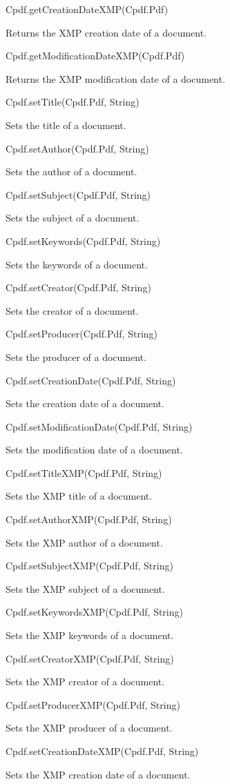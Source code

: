 Cpdf.getCreationDateXMP(Cpdf.Pdf)

Returns the XMP creation date of a document.

Cpdf.getModificationDateXMP(Cpdf.Pdf)

Returns the XMP modification date of a document.

Cpdf.setTitle(Cpdf.Pdf, String)

Sets the title of a document.

Cpdf.setAuthor(Cpdf.Pdf, String)

Sets the author of a document.

Cpdf.setSubject(Cpdf.Pdf, String)

Sets the subject of a document.

Cpdf.setKeywords(Cpdf.Pdf, String)

Sets the keywords of a document.

Cpdf.setCreator(Cpdf.Pdf, String)

Sets the creator of a document.

Cpdf.setProducer(Cpdf.Pdf, String)

Sets the producer of a document.

Cpdf.setCreationDate(Cpdf.Pdf, String)

Sets the creation date of a document.

Cpdf.setModificationDate(Cpdf.Pdf, String)

Sets the modification date of a document.

Cpdf.setTitleXMP(Cpdf.Pdf, String)

Sets the XMP title of a document.

Cpdf.setAuthorXMP(Cpdf.Pdf, String)

Sets the XMP author of a document.

Cpdf.setSubjectXMP(Cpdf.Pdf, String)

Sets the XMP subject of a document.

Cpdf.setKeywordsXMP(Cpdf.Pdf, String)

Sets the XMP keywords of a document.

Cpdf.setCreatorXMP(Cpdf.Pdf, String)

Sets the XMP creator of a document.

Cpdf.setProducerXMP(Cpdf.Pdf, String)

Sets the XMP producer of a document.

Cpdf.setCreationDateXMP(Cpdf.Pdf, String)

Sets the XMP creation date of a document.

